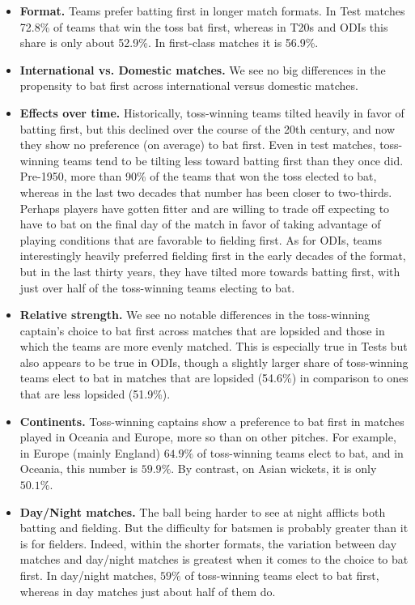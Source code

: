 \documentclass[12pt, letterpaper]{article}
\begin{document}
\begin{itemize}
\item \textbf{Format.} Teams prefer batting first in longer match formats. In Test matches 72.8\% of teams that win the toss bat first, whereas in T20s and ODIs this share is only about 52.9\%. In first-class matches it is 56.9\%. 

\item \textbf{International vs. Domestic matches.} We see no big differences in the propensity to bat first across international versus domestic matches.

\item \textbf{Effects over time.} Historically, toss-winning teams tilted heavily in favor of batting first, but this declined over the course of the 20th century, and now they show no preference (on average) to bat first. Even in test matches, toss-winning teams tend to be tilting less toward batting first than they once did. Pre-1950, more than 90\% of the teams that won the toss elected to bat, whereas in the last two decades that number has been closer to two-thirds. Perhaps players have gotten fitter and are willing to trade off expecting to have to bat on the final day of the match in favor of taking advantage of playing conditions that are favorable to fielding first. As for ODIs, teams interestingly heavily preferred fielding first in the early decades of the format, but in the last thirty years, they have tilted more towards batting first, with just over half of the toss-winning teams electing to bat.

\item \textbf{Relative strength.} We see no notable differences in the toss-winning captain's choice to bat first across matches that are lopsided and those in which the teams are more evenly matched. This is especially true in Tests but also appears to be true in ODIs, though a slightly larger share of toss-winning teams elect to bat in matches that are lopsided (54.6\%) in comparison to ones that are less lopsided (51.9\%).

\item \textbf{Continents.} Toss-winning captains show a preference to bat first in matches played in Oceania and Europe, more so than on other pitches. For example, in Europe (mainly England) $64.9\%$ of toss-winning teams elect to bat, and in Oceania, this number is $59.9\%$. By contrast, on Asian wickets, it is only $50.1\%$.

\item \textbf{Day/Night matches.} The ball being harder to see at night afflicts both batting and fielding. But the difficulty for batsmen is probably greater than it is for fielders. Indeed, within the shorter formats, the variation between day matches and day/night matches is greatest when it comes to the choice to bat first. In day/night matches, $59\%$ of toss-winning teams elect to bat first, whereas in day matches just about half of them do.


\end{itemize}
\end{document}
